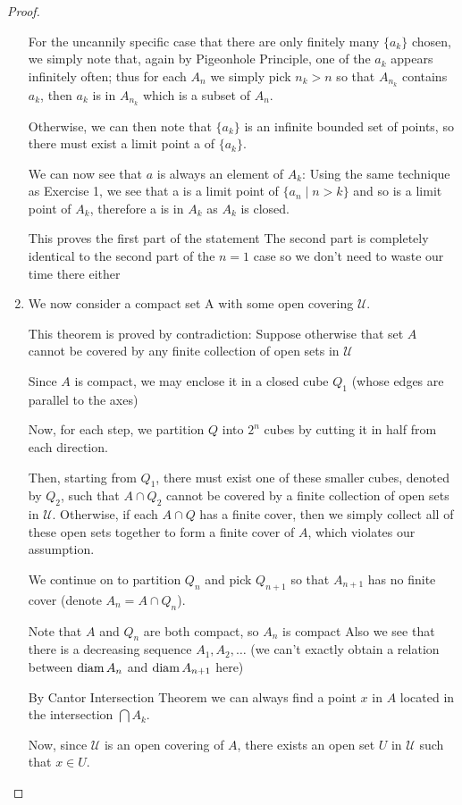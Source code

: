 \begin{proof}
\begin{enumerate}
For the uncannily specific case that there are only finitely many $\{a_k\}$ chosen, we simply note that, again by Pigeonhole Principle, one of the $a_k$ appears infinitely often; thus for each $A_n$ we simply pick $n_k>n$ so that $A_{n_k}$ contains $a_k$, then $a_k$ is in $A_{n_k}$ which is a subset of $A_n$.

Otherwise, we can then note that $\{a_k\}$ is an infinite bounded set of points, so there must exist a limit point a of $\{a_k\}$.

We can now see that $a$ is always an element of $A_k$:
Using the same technique as Exercise 1, we see that a is a limit point of $\{a_n \mid n>k\}$ and so is a limit point of $A_k$, therefore a is in $A_k$ as $A_k$ is closed.

This proves the first part of the statement
The second part is completely identical to the second part of the $n=1$ case so we don't need to waste our time there either

\item We now consider a compact set A with some open covering $\mathscr{U}$.

This theorem is proved by contradiction: 
Suppose otherwise that set $A$ cannot be covered by any finite collection of open sets in $\mathscr{U}$

Since $A$ is compact, we may enclose it in a closed cube $Q_1$ (whose edges are parallel to the axes)

Now, for each step, we partition $Q$ into $2^n$ cubes by cutting it in half from each direction.

Then, starting from $Q_1$, there must exist one of these smaller cubes, denoted by $Q_2$, such that $A \cap Q_2$ cannot be covered by a finite collection of open sets in $\mathscr{U}$. 
Otherwise, if each $A \cap Q$ has a finite cover, then we simply collect all of these open sets together to form a finite cover of $A$, which violates our assumption.

We continue on to partition $Q_n$ and pick $Q_{n+1}$ so that $A_{n+1}$ has no finite cover (denote $A_n = A \cap Q_n$).

Note that $A$ and $Q_n$ are both compact, so $A_n$ is compact
Also we see that there is a decreasing sequence $A_1,A_2,\dots$
(we can't exactly obtain a relation between $\operatorname{diam} A_n$ and $\operatorname{diam} A_{n+1}$ here)

By Cantor Intersection Theorem we can always find a point $x$ in $A$ located in the intersection $\bigcap A_k$.

Now, since $\mathscr{U}$ is an open covering of $A$, there exists an open set $U$ in $\mathscr{U}$ such that $x\in U$.


\end{enumerate}
\end{proof}
